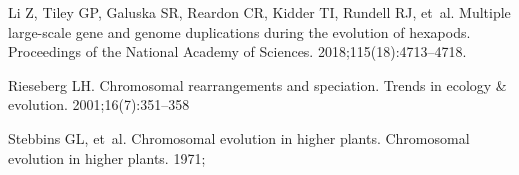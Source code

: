 \documentclass[]{rsos}%
\begin{document}
\begin{thebibliography}{9}
Li Z, Tiley GP, Galuska SR, Reardon CR, Kidder TI, Rundell RJ, et~al.
Multiple large-scale gene and genome duplications during the evolution of hexapods.
Proceedings of the National Academy of Sciences.
2018;115(18):4713--4718.

Rieseberg LH.
Chromosomal rearrangements and speciation.
Trends in ecology \& evolution. 2001;16(7):351--358

Stebbins GL, et~al.
 Chromosomal evolution in higher plants.
 Chromosomal evolution in higher plants. 1971;

\end{thebibliography}
\end{document}

